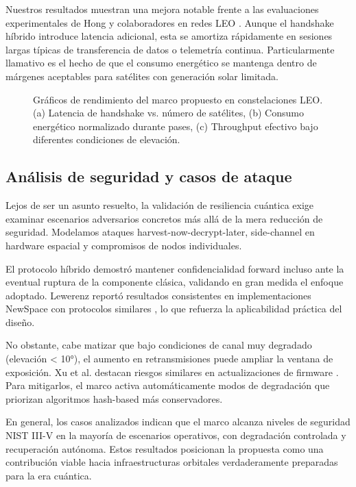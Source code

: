 Nuestros resultados muestran una mejora notable frente a las evaluaciones experimentales de Hong y colaboradores en redes LEO \cite{Hong2026}. Aunque el handshake híbrido introduce latencia adicional, esta se amortiza rápidamente en sesiones largas típicas de transferencia de datos o telemetría continua. Particularmente llamativo es el hecho de que el consumo energético se mantenga dentro de márgenes aceptables para satélites con generación solar limitada.

\begin{figure}[t]
\centering
\scalebox{0.5}{}
\caption{Gráficos de rendimiento del marco propuesto en constelaciones LEO. (a) Latencia de handshake vs. número de satélites, (b) Consumo energético normalizado durante pases, (c) Throughput efectivo bajo diferentes condiciones de elevación.}
\label{fig:rendimiento_leo}
\end{figure}

\subsection{Análisis de seguridad y casos de ataque}

Lejos de ser un asunto resuelto, la validación de resiliencia cuántica exige examinar escenarios adversarios concretos más allá de la mera reducción de seguridad. Modelamos ataques harvest-now-decrypt-later, side-channel en hardware espacial y compromisos de nodos individuales.

El protocolo híbrido demostró mantener confidencialidad forward incluso ante la eventual ruptura de la componente clásica, validando en gran medida el enfoque adoptado. Lewerenz reportó resultados consistentes en implementaciones NewSpace con protocolos similares \cite{Lewerenz2025}, lo que refuerza la aplicabilidad práctica del diseño. 

No obstante, cabe matizar que bajo condiciones de canal muy degradado (elevación < 10°), el aumento en retransmisiones puede ampliar la ventana de exposición. Xu et al. destacan riesgos similares en actualizaciones de firmware \cite{Xu2025}. Para mitigarlos, el marco activa automáticamente modos de degradación que priorizan algoritmos hash-based más conservadores.

En general, los casos analizados indican que el marco alcanza niveles de seguridad NIST III-V en la mayoría de escenarios operativos, con degradación controlada y recuperación autónoma. Estos resultados posicionan la propuesta como una contribución viable hacia infraestructuras orbitales verdaderamente preparadas para la era cuántica.